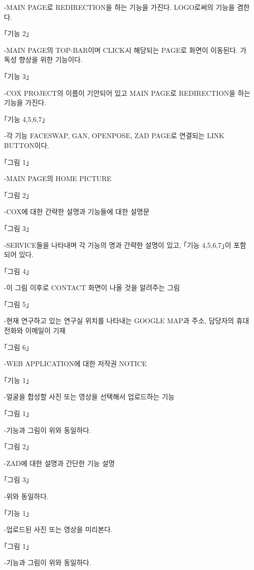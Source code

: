 -MAIN PAGE로 REDIRECTION을 하는 기능을 가진다. LOGO로써의 기능을 겸한다.

｢기능 2｣

-MAIN PAGE의 TOP-BAR이며 CLICK시 해당되는 PAGE로 화면이 이동된다. 가독성 향상을 위한 기능이다.

｢기능 3｣

-COX PROJECT의 이름이 기안되어 있고 MAIN PAGE로 REDIRECTION을 하는 기능을 가진다.

｢기능 4,5,6,7｣

-각 기능 FACESWAP, GAN, OPENPOSE, ZAD PAGE로 연결되는 LINK BUTTON이다.

｢그림 1｣

-MAIN PAGE의 HOME PICTURE

｢그림 2｣

-COX에 대한 간략한 설명과 기능들에 대한 설명문

｢그림 3｣

-SERVICE들을 나타내며 각 기능의 명과 간략한 설명이 있고, ｢기능 4,5,6,7｣이 포함되어 있다.

｢그림 4｣

-이 그림 이후로 CONTACT 화면이 나올 것을 알려주는 그림

｢그림 5｣

-현재 연구하고 있는 연구실 위치를 나타내는 GOOGLE MAP과 주소, 담당자의 휴대전화와 이메일이 기재

｢그림 6｣

-WEB APPLICATION에 대한 저작권 NOTICE

\begin{figure}[h!]
\centering
\end{figure}
｢기능 1｣

-얼굴을 합성할 사진 또는 영상을 선택해서 업로드하는 기능

｢그림 1｣

-기능과 그림이 위와 동일하다.

｢그림 2｣

-ZAD에 대한 설명과 간단한 기능 설명

｢그림 3｣

-위와 동일하다.

\begin{figure}[h!]
\centering
\end{figure}

｢기능 1｣

-업로드된 사진 또는 영상을 미리본다.

｢그림 1｣

-기능과 그림이 위와 동일하다.

